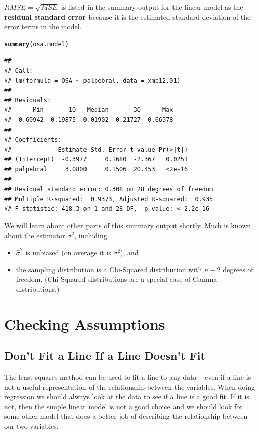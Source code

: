 \documentclass[twoside]{book}
\makeatletter
\newcommand{\hlstd}[1]{\textcolor[rgb]{0.345,0.345,0.345}{#1}}%
\newcommand{\hlkwd}[1]{\textcolor[rgb]{0.737,0.353,0.396}{\textbf{#1}}}%
\newenvironment{kframe}{%
 \def\at@end@of@kframe{}%
 \ifinner\ifhmode%
  \def\at@end@of@kframe{\end{minipage}}%
  \begin{minipage}{\columnwidth}%
 \fi\fi%
 \def\FrameCommand##1{\hskip\@totalleftmargin \hskip-\fboxsep
 \colorbox{shadecolor}{##1}\hskip-\fboxsep
     \hskip-\linewidth \hskip-\@totalleftmargin \hskip\columnwidth}%
 \MakeFramed {\advance\hsize-\width
   \@totalleftmargin\z@ \linewidth\hsize
   \@setminipage}}%
 {\par\unskip\endMakeFramed%
 \at@end@of@kframe}
\newenvironment{knitrout}{}{} %
\def\term#1{\textbf{#1}}
\makeatother
\begin{document}
$RMSE = \sqrt{MSE}$ is listed in the summary output for the linear model as the
\term{residual standard error} because it is the estimated standard deviation of 
the error terms in the model.
\begin{knitrout}
\color{fgcolor}\begin{kframe}
\begin{alltt}
\hlkwd{summary}\hlstd{(osa.model)}
\end{alltt}
\begin{verbatim}
## 
## Call:
## lm(formula = OSA ~ palpebral, data = xmp12.01)
## 
## Residuals:
##      Min       1Q   Median       3Q      Max 
## -0.60942 -0.19875 -0.01902  0.21727  0.66378 
## 
## Coefficients:
##             Estimate Std. Error t value Pr(>|t|)
## (Intercept)  -0.3977     0.1680  -2.367   0.0251
## palpebral     3.0800     0.1506  20.453   <2e-16
## 
## Residual standard error: 0.308 on 28 degrees of freedom
## Multiple R-squared:  0.9373,	Adjusted R-squared:  0.935 
## F-statistic: 418.3 on 1 and 28 DF,  p-value: < 2.2e-16
\end{verbatim}
\end{kframe}
\end{knitrout}
We will learn about other parts of this summary output shortly.
Much is known about the estimator $\sigma^2$, including 
\begin{itemize}
	\item $\hat \sigma^2$ is unbiased (on average it is $\sigma^2$), and 
	\item
		the sampling distribution is a Chi-Squared distribution with
		$n-2$ degrees of freedom.  
		(Chi-Squared distributions are a special case of Gamma distributions.)
\end{itemize}


\section{Checking Assumptions}

\subsection{Don't Fit a Line If a Line Doesn't Fit}

The least squares method can be used to fit a line to any data -- even if a line
is not a useful representation of the relationship between the variables.
When doing regression we should always look at the data to see if a line 
is a good fit.  If it is not, then the simple linear model is not a good choice and 
we should look for some other model that does a better job of describing the 
relationship between our two variables.  
\end{document}
